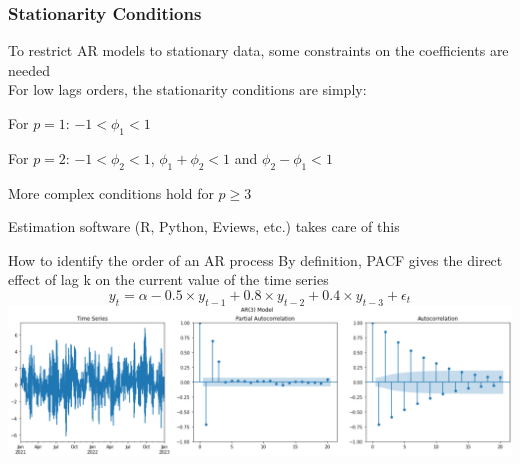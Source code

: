 \documentclass{beamer}
\newenvironment{wideitemize}{\itemize\addtolength{\itemsep}{10pt}}{\enditemize}
\begin{document}
\begin{frame}
  \frametitle{Stationarity Conditions}
  To restrict AR models to stationary data, some constraints on the coefficients are needed\\
\medskip
  For low lags orders, the stationarity conditions are simply:\\
  
  \begin{wideitemize}
  \item For $p=1$: $-1 < \phi_1 < 1$
  \item For $p=2$:  $-1 < \phi_2 < 1$, $ \phi_1 + \phi_2 < 1$ and $ \phi_2 - \phi_1 < 1$
  \item More complex conditions hold for $p \geq 3$
  \item Estimation software (R, Python, Eviews, etc.) takes care of this
  \end{wideitemize}
  
\end{frame}

\begin{frame}{How to identify the order of an AR process}
    By definition, PACF gives the direct effect of lag k on the current value of the time series
    $$y_t =\alpha -0.5 \times y_{t-1} + 0.8 \times y_{t-2} + 0.4 \times y_{t-3} + \epsilon_t$$
    \vspace{2pt}
    \includegraphics[width=\textwidth] {static/course_2_img/AR_PACF.png}
\end{frame}
\end{document}
